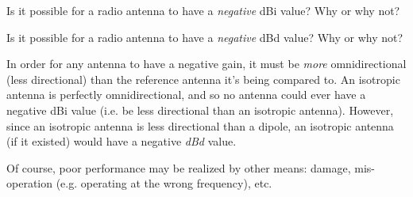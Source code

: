 

Is it possible for a radio antenna to have a {\it negative} dBi value?  Why or why not?

\vskip 10pt

Is it possible for a radio antenna to have a {\it negative} dBd value?  Why or why not?

\vskip 10pt







In order for any antenna to have a negative gain, it must be {\it more} omnidirectional (less directional) than the reference antenna it's being compared to.  An isotropic antenna is perfectly omnidirectional, and so no antenna could ever have a negative dBi value (i.e. be less directional than an isotropic antenna).  However, since an isotropic antenna is less directional than a dipole, an isotropic antenna (if it existed) would have a negative {\it dBd} value.

\vskip 10pt

Of course, poor performance may be realized by other means: damage, mis-operation (e.g. operating at the wrong frequency), etc.










